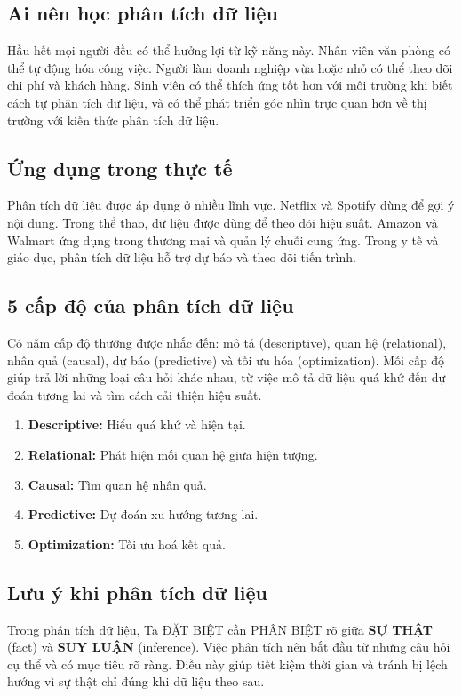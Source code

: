 \documentclass[11pt]{article}
\begin{document}
\subsection{Ai nên học phân tích dữ liệu}
Hầu hết mọi người đều có thể hưởng lợi từ kỹ năng này. Nhân viên văn phòng có thể tự động hóa công việc. Người làm doanh nghiệp vừa hoặc nhỏ có thể theo dõi chi phí và khách hàng. Sinh viên có thể thích ứng tốt hơn với môi trường khi biết cách tự phân tích dữ liệu, và có thể phát triển góc nhìn trực quan hơn về thị trường với kiến thức phân tích dữ liệu.

\subsection{Ứng dụng trong thực tế}
Phân tích dữ liệu được áp dụng ở nhiều lĩnh vực. Netflix và Spotify dùng để gợi ý nội dung. Trong thể thao, dữ liệu được dùng để theo dõi hiệu suất. Amazon và Walmart ứng dụng trong thương mại và quản lý chuỗi cung ứng. Trong y tế và giáo dục, phân tích dữ liệu hỗ trợ dự báo và theo dõi tiến trình.


\subsection{5 cấp độ của phân tích dữ liệu}
Có năm cấp độ thường được nhắc đến: mô tả (descriptive), quan hệ (relational), nhân quả (causal), dự báo (predictive) và tối ưu hóa (optimization). Mỗi cấp độ giúp trả lời những loại câu hỏi khác nhau, từ việc mô tả dữ liệu quá khứ đến dự đoán tương lai và tìm cách cải thiện hiệu suất.
\begin{enumerate}
    \item \textbf{Descriptive:} Hiểu quá khứ và hiện tại.
    \item \textbf{Relational:} Phát hiện mối quan hệ giữa hiện tượng.
    \item \textbf{Causal:} Tìm quan hệ nhân quả.
    \item \textbf{Predictive:} Dự đoán xu hướng tương lai.
    \item \textbf{Optimization:} Tối ưu hoá kết quả.
\end{enumerate}

\subsection{Lưu ý khi phân tích dữ liệu}
Trong phân tích dữ liệu, Ta ĐẶT BIỆT cần PHÂN BIỆT rõ giữa \textbf{SỰ THẬT} (fact) và \textbf{SUY LUẬN} (inference).
Việc phân tích nên bắt đầu từ những câu hỏi cụ thể và có mục tiêu rõ ràng. Điều này giúp tiết kiệm thời gian và tránh bị lệch hướng vì sự thật chỉ đúng khi dữ liệu theo sau.
\end{document}
